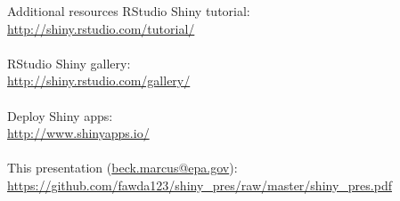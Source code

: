 \documentclass[serif]{beamer}\usepackage[]{graphicx}\usepackage[]{color}
\begin{document}
\begin{frame}{Additional resources}
RStudio Shiny tutorial:\\ \url{http://shiny.rstudio.com/tutorial/} \\~\\
RStudio Shiny gallery:\\ \url{http://shiny.rstudio.com/gallery/} \\~\\
Deploy Shiny apps: \\ \url{http://www.shinyapps.io/} \\~\\
This presentation (\url{beck.marcus@epa.gov}):\\ \url{https://github.com/fawda123/shiny_pres/raw/master/shiny_pres.pdf}
\end{frame}
\end{document}
